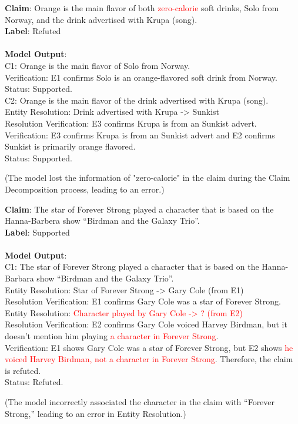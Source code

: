 \small{\begin{casebox}
\textbf{Claim}: Orange is the main flavor of both \textcolor{red}{zero-calorie} soft drinks, Solo from Norway, and the drink advertised with Krupa (song).\\
\textbf{Label}: Refuted\\\\
\textbf{Model Output}:\\
C1: Orange is the main flavor of Solo from Norway.\\Verification: E1 confirms Solo is an orange-flavored soft drink from Norway.\\Status: Supported.\vspace{1mm}\\C2: Orange is the main flavor of the drink advertised with Krupa (song).\\Entity Resolution: Drink advertised with Krupa -> Sunkist\\Resolution Verification: E3 confirms Krupa is from an Sunkist advert.\\Verification: E3 confirms Krupa is from an Sunkist advert and E2 confirms Sunkist is primarily orange flavored.\\Status: Supported.
\end{casebox}}
(The model lost the information of "zero-calorie" in the claim during the Claim Decomposition process, leading to an error.)

\small{\begin{casebox}
\textbf{Claim}: The star of Forever Strong played a character that is based on the Hanna-Barbera show ``Birdman and the Galaxy Trio''.\\
\textbf{Label}: Supported\\\\
\textbf{Model Output}:\\
C1: The star of Forever Strong played a character that is based on the Hanna-Barbara show ``Birdman and the Galaxy Trio''.\\Entity Resolution: Star of Forever Strong -> Gary Cole (from E1)\\Resolution Verification: E1 confirms Gary Cole was a star of Forever Strong.\\Entity Resolution: \textcolor{red}{Character played by Gary Cole -> ? (from E2)}\\Resolution Verification: E2 confirms Gary Cole voiced Harvey Birdman, but it doesn't mention him playing \textcolor{red}{a character in Forever Strong}.\\Verification: E1 shows Gary Cole was a star of Forever Strong, but E2 shows \textcolor{red}{he voiced Harvey Birdman, not a character in Forever Strong}. Therefore, the claim is refuted.\\Status: Refuted.
\end{casebox}}
(The model incorrectly associated the character in the claim with ``Forever Strong,'' leading to an error in Entity Resolution.)